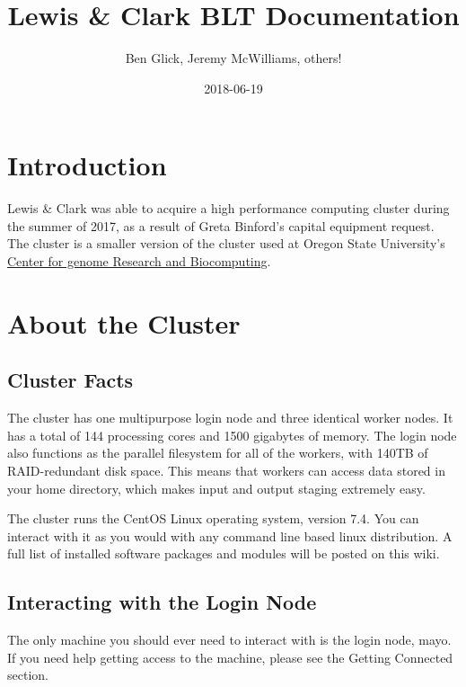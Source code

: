 \documentclass[]{book}
\title{Lewis \& Clark BLT Documentation}
\author{Ben Glick, Jeremy McWilliams, others!}
\date{2018-06-19}
\begin{document}
\maketitle

{
\setcounter{tocdepth}{1}
\tableofcontents
}
\chapter*{Introduction}\label{introduction}

Lewis \& Clark was able to acquire a high performance computing cluster
during the summer of 2017, as a result of Greta Binford's capital
equipment request. The cluster is a smaller version of the cluster used
at Oregon State University's \href{http://cgrb.oregonstate.edu/}{Center
for genome Research and Biocomputing}.

\chapter{About the Cluster}\label{about-the-cluster}

\section{Cluster Facts}\label{cluster-facts}

The cluster has one multipurpose login node and three identical worker
nodes. It has a total of 144 processing cores and 1500 gigabytes of
memory. The login node also functions as the parallel filesystem for all
of the workers, with 140TB of RAID-redundant disk space. This means that
workers can access data stored in your home directory, which makes input
and output staging extremely easy.

The cluster runs the CentOS Linux operating system, version 7.4. You can
interact with it as you would with any command line based linux
distribution. A full list of installed software packages and modules
will be posted on this wiki.

\section{Interacting with the Login
Node}\label{interacting-with-the-login-node}

The only machine you should ever need to interact with is the login
node, mayo. If you need help getting access to the machine, please see
the Getting Connected section.
\end{document}
